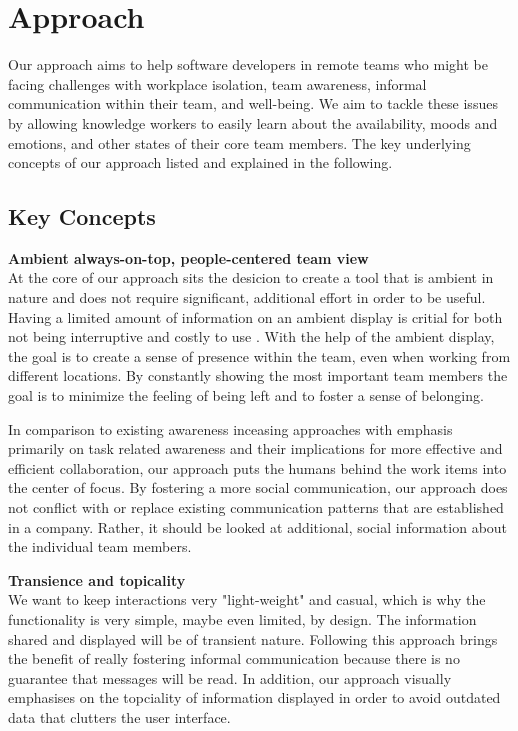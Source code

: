 \chapter{Approach}
\label{chapter:approach}

Our approach aims to help software developers in remote teams who might be facing challenges with workplace isolation, team awareness, informal communication within their team, and well-being. We aim to tackle these issues by allowing knowledge workers to easily learn about the availability, moods and emotions, and other states of their core team members. The key underlying concepts of our approach listed and explained in the following.

\section{Key Concepts}
\medskip\noindent\textbf{Ambient always-on-top, people-centered team view} \\
At the core of our approach sits the desicion to create a tool that is ambient in nature and does not require significant, additional effort in order to be useful. Having a limited amount of information on an ambient display is critial for both not being interruptive and costly to use \autocite{dabbish2004controlling}. With the help of the ambient display, the goal is to create a sense of presence within the team, even when working from different locations. By constantly showing the most important team members the goal is to minimize the feeling of being left and to foster a sense of belonging.

In comparison to existing awareness inceasing approaches with emphasis primarily on task related awareness and their implications for more effective and efficient collaboration, our approach puts the humans behind the work items into the center of focus. By fostering a more social communication, our approach does not conflict with or replace existing communication patterns that are established in a company. Rather, it should be looked at additional, social information about the individual team members.

\medskip\noindent\textbf{Transience and topicality} \\
We want to keep interactions very "light-weight" and casual, which is why the functionality is very simple, maybe even limited, by design. The information shared and displayed will be of transient nature. Following this approach brings the benefit of really fostering informal communication because there is no guarantee that messages will be read. In addition, our approach visually emphasises on the topciality of information displayed in order to avoid outdated data that clutters the user interface.

